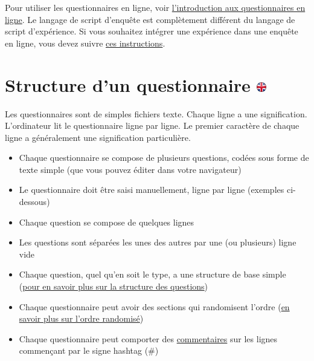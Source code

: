 \documentclass[
]{book}
\providecommand{\tightlist}{%
  \setlength{\itemsep}{0pt}\setlength{\parskip}{0pt}}
\begin{document}
Pour utiliser les questionnaires en ligne, voir
\protect\hyperlink{s7}{l'introduction aux questionnaires en ligne}. Le
langage de script d'enquête est complètement différent du langage de
script d'expérience. Si vous souhaitez intégrer une expérience dans une
enquête en ligne, vous devez suivre
\href{https://www.psytoolkit.org/doc3.2.0/online-survey-syntax.html\#experiment}{ces
instructions}.

\hypertarget{structure-dun-questionnaire-ukflag}{%
\section[Structure d'un questionnaire ]{\texorpdfstring{Structure d'un
questionnaire
\href{https://www.psytoolkit.org/doc3.1.0/online-survey-syntax.html\#_structure_of_questionnaire}{\protect\includegraphics{img/ukflag.png}}}{Structure d'un questionnaire ukflag}}\label{structure-dun-questionnaire-ukflag}}

Les questionnaires sont de simples fichiers texte. Chaque ligne a une
signification. L'ordinateur lit le questionnaire ligne par ligne. Le
premier caractère de chaque ligne a généralement une signification
particulière.

\begin{itemize}
\tightlist
\item
  Chaque questionnaire se compose de plusieurs questions, codées sous
  forme de texte simple (que vous pouvez éditer dans votre navigateur)
\item
  Le questionnaire doit être saisi manuellement, ligne par ligne
  (exemples ci-dessous)
\item
  Chaque question se compose de quelques lignes
\item
  Les questions sont séparées les unes des autres par une (ou plusieurs)
  ligne vide
\item
  Chaque question, quel qu'en soit le type, a une structure de base
  simple (\protect\hyperlink{s8-1-1}{pour en savoir plus sur la
  structure des questions})
\item
  Chaque questionnaire peut avoir des sections qui randomisent l'ordre
  (\protect\hyperlink{}{en savoir plus sur l'ordre randomisé})
\item
  Chaque questionnaire peut comporter des
  \protect\hyperlink{}{commentaires} sur les lignes commençant par le
  signe hashtag (\#)
\end{itemize}
\end{document}
